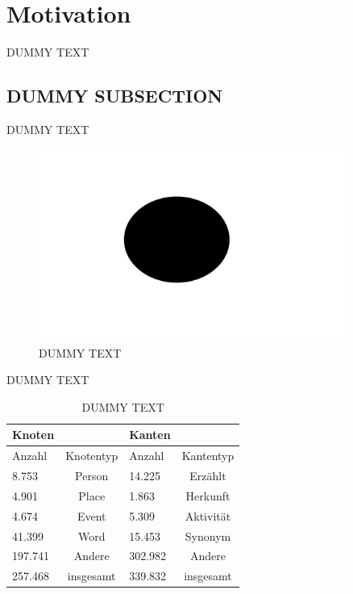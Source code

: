 \section{Motivation}
\label{sec-2}
DUMMY TEXT

\subsection{DUMMY SUBSECTION}
\label{sec-2-1}
\par
DUMMY TEXT


\begin{figure}[h!]
	\centering
	\includegraphics[width=0.9\textwidth]{images/dummy_image.png}
	\caption{DUMMY TEXT}
	\label{img:dummy-image}
\end{figure}


\par
DUMMY TEXT\\

\setlength\extrarowheight{2pt}
\begin{table}[htb]
	\centering
	\begin{tabular}{lc|lc}
		Knoten & & Kanten &\\
		\hline
		Anzahl & Knotentyp & Anzahl & Kantentyp\\
		\hline
		8.753 & Person & 14.225 & Erzählt\\
		4.901 & Place & 1.863 & Herkunft\\
		4.674 & Event & 5.309 & Aktivität\\
		41.399 & Word & 15.453 & Synonym\\
		\hline
		197.741 & Andere & 302.982 & Andere\\
		\hline
		257.468 & insgesamt & 339.832 & insgesamt
	\end{tabular}\caption{\label{tab:node-edge-data} DUMMY TEXT}
\end{table}

